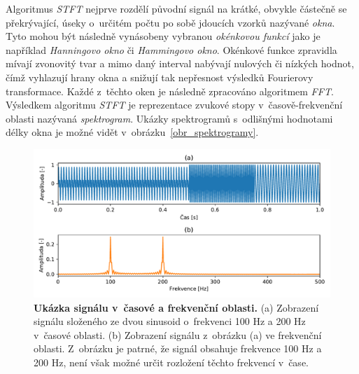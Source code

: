 Algoritmus \textit{STFT} nejprve rozdělí původní signál na krátké, obvykle částečně se překrývající, úseky o~určitém počtu po sobě jdoucích vzorků nazývané \textit{okna}. Tyto mohou být následně vynásobeny vybranou \textit{okénkovou funkcí} jako je například \textit{Hanningovo okno} či \textit{Hammingovo okno}. Okénkové funkce zpravidla mívají zvonovitý tvar a mimo daný interval nabývají nulových či nízkých hodnot, čímž vyhlazují hrany okna a snižují tak nepřesnost výsledků Fourierovy transformace. Každé z~těchto oken je následně zpracováno algoritmem \textit{FFT}. Výsledkem algoritmu \textit{STFT} je reprezentace zvukové stopy v~časově-frekvenční oblasti nazývaná \textit{spektrogram}. Ukázky spektrogramů s~odlišnými hodnotami délky okna je možné vidět v~obrázku~\ref{obr_spektrogramy}. \cite{MIR}\cite{low_level}\cite{mircom}\cite{aca}

\begin{figure}[h]
    \centering
    \includegraphics[width=\textwidth]{obrazky/casova_a_frekvencni_oblast.pdf}
    \caption{\textbf{Ukázka signálu v~časové a frekvenční oblasti.} (a) Zobrazení signálu složeného ze dvou sinusoid o~frekvenci 100 Hz a 200 Hz v~časové oblasti. (b) Zobrazení signálu z~obrázku (a) ve frekvenční oblasti. Z~obrázku je patrné, že signál obsahuje frekvence 100 Hz a 200 Hz, není však možné určit rozložení těchto frekvencí v~čase.}
    \label{obr_casova_a_frekvencni_oblast}
\end{figure}


